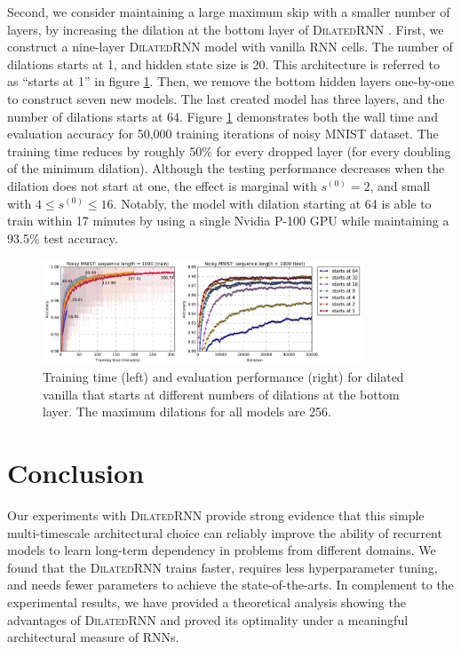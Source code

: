 \documentclass{article}
\newcommand{\algname}{\textsc{DilatedRNN }}
\begin{document}
Second, we consider maintaining a large maximum skip with a smaller number of layers, by increasing the dilation at the bottom layer of \algname.  First, we construct a nine-layer \algname model with vanilla RNN cells.  The number of dilations starts at 1, and hidden state size is 20. This architecture is referred to as ``starts at 1'' in figure \ref{fig:decrease}.  Then, we remove the bottom hidden layers one-by-one to construct seven new models.  The last created model has three layers, and the number of dilations starts at 64.   Figure \ref{fig:decrease} demonstrates both the wall time and evaluation accuracy for 50,000 training iterations of noisy MNIST dataset.  The training time reduces by roughly 50\% for every dropped layer (for every doubling of the minimum dilation).  Although the testing performance decreases when the dilation does not start at one, the effect is marginal with $s^{(0)}=2$, and small with $4\le s^{(0)}\le 16$.  Notably, the model with dilation starting at 64 is able to train within 17 minutes by using a single Nvidia P-100 GPU while maintaining a 93.5\% test accuracy.

\begin{figure}[t]
  \centering
  \includegraphics[width=0.85\textwidth]{./figure/decrease.png}
  \vspace*{-0.05in}
  \caption{Training time (left) and evaluation performance (right) for dilated vanilla that starts at different numbers of dilations at the bottom layer. The maximum dilations for all models are 256.  }
  \label{fig:decrease}
 \vspace*{-0.05in}
\end{figure}

\section{Conclusion}
Our experiments with \algname provide strong evidence that this simple multi-timescale architectural choice can reliably improve the ability of recurrent models to learn long-term dependency in problems from different domains. We found that the \algname trains faster, requires less hyperparameter tuning, and needs fewer parameters to achieve the state-of-the-arts.  In complement to the experimental results, we have provided a theoretical analysis showing the advantages of \algname and proved its optimality under a meaningful architectural measure of RNNs. 
\end{document}
